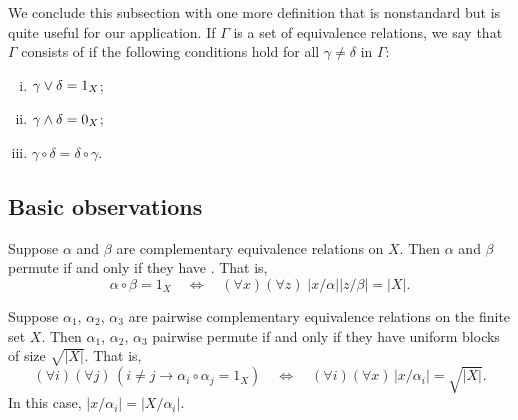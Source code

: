 We conclude this subsection with one more definition
that is nonstandard but is quite useful for our application.
If $\Gamma$ is a set of equivalence relations, 
we say that $\Gamma$ consists of 
if the following conditions hold for all $\gamma \neq \delta$ in $\Gamma$:
\begin{enumerate}[(i)]
\item $\gamma \vee \delta = 1_X$;
\item $\gamma \wedge \delta = 0_X$;  
\item $\gamma \circ \delta = \delta \circ \gamma$.  
\end{enumerate}




\subsection{Basic observations}
\begin{lemma}
\label{lem:1}
Suppose $\alpha$ and $\beta$ are complementary equivalence relations on
$X$. Then $\alpha$ and $\beta$ permute if and only if they have \cubs.
That is,
\begin{equation}
  \label{eq:9}
\alpha \circ \beta =1_X \quad \Longleftrightarrow \quad (\forall x)(\forall z)\;
|x/\alpha| |z/\beta| = |X|.
\end{equation}
\end{lemma}
\begin{corollary}
\label{cor:1}
Suppose $\alpha_1$, $\alpha_2$, $\alpha_3$ are pairwise complementary
equivalence relations on the finite set $X$. 
Then  $\alpha_1$, $\alpha_2$, $\alpha_3$ pairwise permute if and only if they
have uniform blocks of size $\sqrt{|X|}$.  That is,
\[
(\forall i)(\forall j) \, (i\neq j \longrightarrow \alpha_i \circ \alpha_j = 1_X)
\quad \Longleftrightarrow \quad (\forall i)(\forall x) \, |x/\alpha_i| =
\sqrt{|X|}.
\]
In this case,  $|x/\alpha_i| = |X/\alpha_i|$. %
\end{corollary}
